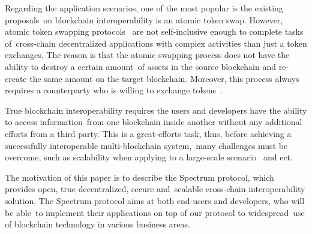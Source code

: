 Regarding the application scenarios, one of the most popular is the existing proposals\
on blockchain interoperability is an atomic token swap.
However, atomic token swapping protocols~\cite{Miraz2019} are not self-inclusive enough to complete tasks of\
cross-chain decentralized applications with complex activities than just a token exchanges.
The reason is that the atomic swapping process does not have the ability to destroy a certain amount\
of assets in the source blockchain and re-create the same amount on the target blockchain.
Moreover, this process always requires a counterparty who is willing to exchange tokens~\cite{Schulte2019TowardsBI}.

True blockchain interoperability requires the users and developers have the ability to access information\
from one blockchain inside another without any additional efforts from a third party.
This is a great-efforts task, thus, before achieving a successfully interoperable multi-blockchain system,\
many challenges must be overcome, such as scalability when applying to a large-scale scenario~\cite{Kim2018} and ect.

The motivation of this paper is to describe the Spectrum protocol, which provides open, true decentralized, secure and\
scalable cross-chain interoperability solution.
The Spectrum protocol aims at both end-users and developers, who will be able\
to implement their applications on top of our protocol to widespread\
use of blockchain technology in various business areas.
